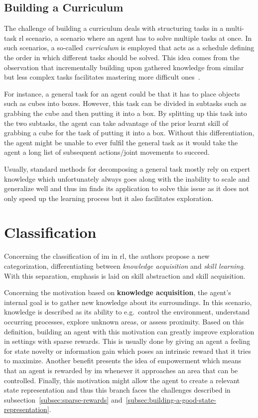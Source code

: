 \documentclass[draft,final]{vutinfth} %
\begin{document}
    \subsection{Building a Curriculum}\label{subsec:building-a-curriculum}
    The challenge of building a curriculum deals with structuring tasks in a multi-task \gls{rl} scenario, a scenario where an agent has to solve multiple tasks at once.
    In such scenarios, a so-called \textit{curriculum} is employed that acts as a schedule defining the order in which different tasks should be solved.
    This idea comes from the observation that incrementally building upon gathered knowledge from similar but less complex tasks facilitates mastering more difficult ones~\citep{aubret_survey_2019}.

    For instance, a general task for an agent could be that it has to place objects such as cubes into boxes.
    However, this task can be divided in subtasks such as grabbing the cube and then putting it into a box.
    By splitting up this task into the two subtasks, the agent can take advantage of the prior learnt skill of grabbing a cube for the task of putting it into a box.
    Without this differentiation, the agent might be unable to ever fulfil the general task as it would take the agent a long list of subsequent actions/joint movements to succeed.

    Usually, standard methods for decomposing a general task mostly rely on expert knowledge which unfortunately always goes along with the inability to scale and generalize well and thus \gls{im} finds its application to solve this issue as it does not only speed up the learning process but it also facilitates exploration.


    \section{Classification}

    Concerning the classification of \gls{im} in \gls{rl}, the authors \citeauthor{aubret_survey_2019} propose a new categorization, differentiating between \textit{knowledge acquisition} and \textit{skill learning}.
    With this separation, emphasis is laid on skill abstraction and skill acquisition.

    Concerning the motivation based on \textbf{knowledge acquisition}, the agent's internal goal is to gather new knowledge about its surroundings.
    In this scenario, knowledge is described as its ability to e.g.\ control the environment, understand occurring processes, explore unknown areas, or assess proximity.
    Based on this definition, building an agent with this motivation can greatly improve exploration in settings with sparse rewards.
    This is usually done by giving an agent a feeling for state novelty or information gain which poses an intrinsic reward that it tries to maximize.
    Another benefit presents the idea of empowerment which means that an agent is rewarded by \gls{im} whenever it approaches an area that can be controlled.
    Finally, this motivation might allow the agent to create a relevant state representation and thus this branch faces the challenges described in subsection~\ref{subsec:sparse-rewards} and~\ref{subsec:building-a-good-state-representation}.
\end{document}
